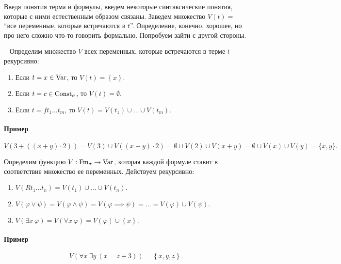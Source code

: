 Введя понятия терма и формулы, введем некоторые синтаксические понятия, которые с ними естественным образом связаны.
Заведем множество $V(t) = $ \enquote{все переменные, которые встречаются в $t$}.
Определение, конечно, хорошее, но про него сложно что-то говорить формально.
Попробуем зайти с другой стороны.
\begin{definition}~ \label{def::variables-in-term}
    Определим множество $V$ всех переменных, которые встречаются в терме $t$ рекурсивно:
    \begin{enumerate}
        \item Если $t = x \in \mathrm{Var}$, то $V(t) = \left\{x\right\}$.
        \item Если $t = c \in \mathrm{Const}_{\sigma}$, то $V(t) = \emptyset$.
        \item Если $t = f t_{1} \ldots t_{m}$, то $V(t) = V(t_{1}) \cup \ldots \cup V(t_{m})$.
    \end{enumerate}
\end{definition}

\paragraph{Пример}
$$
    V\left(3 + \left(\left(x + y\right) \cdot 2\right)\right) = V(3) \cup V\left(\left(x + y\right) \cdot 2\right) = \emptyset \cup V\left(2\right) \cup V\left(x + y\right) = \emptyset \cup V(x) \cup V(y) = \{x, y\}.
$$

\begin{definition}
    Определим функцию $V: \mathrm{Fm}_{\sigma} \to \mathrm{Var}$, которая каждой формуле ставит в соответствие множество ее переменных.
    Действуем рекурсивно:
    \begin{enumerate}
        \item $V\left(R t_{1} \ldots t_{n}\right) = V(t_{1}) \cup \ldots \cup V(t_{n})$.
        \item $V\left(\varphi \lor \psi\right) = V\left(\varphi \land \psi\right) = V\left(\varphi \implies \psi\right) = \ldots = V(\varphi) \cup V(\psi)$.
        \item $V(\exists x~\varphi) = V(\forall x~\varphi) = V(\varphi) \cup \left\{x\right\}$.
    \end{enumerate}
\end{definition}

\paragraph{Пример}
$$
    V\left(\forall x~ \exists y~ \left(x = z + 3\right)\right) = \left\{x, y, z\right\}.
$$

